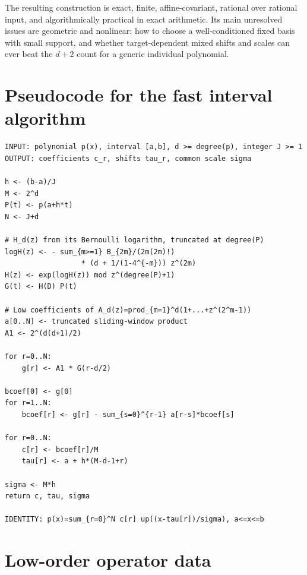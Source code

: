 \documentclass[11pt,oneside]{article}
\theoremstyle{definition}
\theoremstyle{remark}
\begin{document}
The resulting construction is exact, finite, affine-covariant, rational over rational input, and algorithmically practical in exact arithmetic.  Its main unresolved issues are geometric and nonlinear: how to choose a well-conditioned fixed basis with small support, and whether target-dependent mixed shifts and scales can ever beat the $d+2$ count for a generic individual polynomial.

\appendix

\section{Pseudocode for the fast interval algorithm}

\begin{lstlisting}[style=pseudo,caption={Exact polynomial synthesis on an arbitrary interval.}]
INPUT: polynomial p(x), interval [a,b], d >= degree(p), integer J >= 1
OUTPUT: coefficients c_r, shifts tau_r, common scale sigma

h <- (b-a)/J
M <- 2^d
P(t) <- p(a+h*t)
N <- J+d

# H_d(z) from its Bernoulli logarithm, truncated at degree(P)
logH(z) <- - sum_{m>=1} B_{2m}/(2m(2m)!)
                  * (d + 1/(1-4^{-m})) z^(2m)
H(z) <- exp(logH(z)) mod z^(degree(P)+1)
G(t) <- H(D) P(t)

# Low coefficients of A_d(z)=prod_{m=1}^d(1+...+z^(2^m-1))
a[0..N] <- truncated sliding-window product
A1 <- 2^(d(d+1)/2)

for r=0..N:
    g[r] <- A1 * G(r-d/2)

bcoef[0] <- g[0]
for r=1..N:
    bcoef[r] <- g[r] - sum_{s=0}^{r-1} a[r-s]*bcoef[s]

for r=0..N:
    c[r] <- bcoef[r]/M
    tau[r] <- a + h*(M-d-1+r)

sigma <- M*h
return c, tau, sigma

IDENTITY: p(x)=sum_{r=0}^N c[r] up((x-tau[r])/sigma), a<=x<=b
\end{lstlisting}

\section{Low-order operator data}
\end{document}

